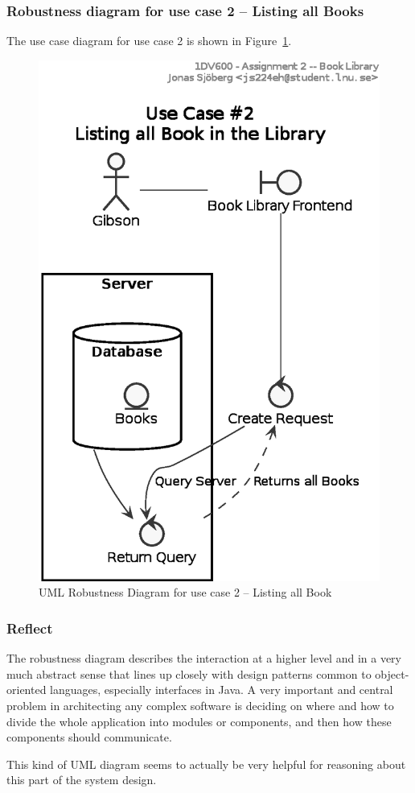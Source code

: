 \subsubsection{Robustness diagram for use case 2 -- Listing all Books}\label{task-1b-robust2}
The use case diagram for use case 2 is shown in Figure~\ref{fig:uml-usecase2rob}.

\begin{figure}[htbp]
  \centering
  \includegraphics[width=0.5\linewidth]{include/uml-use-case-2-rob.eps}
  \caption{UML Robustness Diagram for use case 2 -- Listing all Book}
  \label{fig:uml-usecase2rob}
\end{figure}


\subsubsection{Reflect}\label{task-1b-reflect}
The robustness diagram describes the interaction at a higher level and in a
very much abstract sense  that lines up closely with design patterns common to
object-oriented languages, especially interfaces in Java.
A very important and central problem in architecting any complex software is
deciding on where and how to divide the whole application into modules or
components, and then how these components should communicate.

This kind of UML diagram seems to actually be very helpful for reasoning about
this part of the system design.



